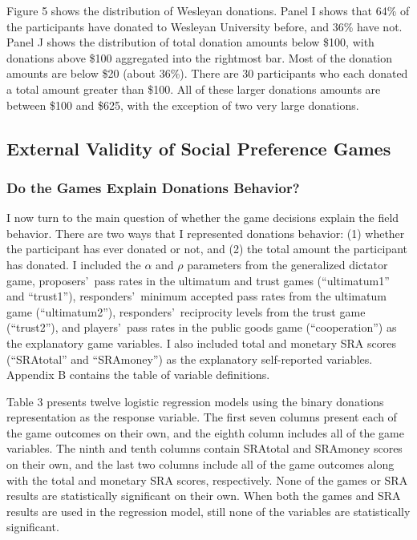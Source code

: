 \documentclass[12pt]{article}
\begin{document}
Figure 5 shows the distribution of Wesleyan donations. Panel I shows that 64\% of the participants have donated to Wesleyan University before, and 36\% have not. Panel J shows the distribution of total donation amounts below \$100, with donations above \$100 aggregated into the rightmost bar. Most of the donation amounts are below \$20 (about 36\%). There are 30 participants who each donated a total amount greater than \$100. All of these larger donations amounts are between \$100 and \$625, with the exception of two very large donations.

\subsection{External Validity of Social Preference Games}

\subsubsection{Do the Games Explain Donations Behavior?}
I now turn to the main question of whether the game decisions explain the field behavior. There are two ways that I represented donations behavior: (1) whether the participant has ever donated or not, and (2) the total amount the participant has donated. I included the \(\alpha\) and \(\rho\) parameters from the generalized dictator game, proposers\rq \ pass rates in the ultimatum and trust games (``ultimatum1'' and ``trust1''), responders\rq \ minimum accepted pass rates from the ultimatum game (``ultimatum2''), responders\rq \ reciprocity levels from the trust game (``trust2''), and players\rq \ pass rates in the public goods game (``cooperation'') as the explanatory game variables. I also included total and monetary SRA scores (``SRAtotal'' and ``SRAmoney'') as the explanatory self-reported variables. Appendix B contains the table of variable definitions. 

Table 3 presents twelve logistic regression models using the binary donations representation as the response variable. The first seven columns present each of the game outcomes on their own, and the eighth column includes all of the game variables. The ninth and tenth columns contain SRAtotal and SRAmoney scores on their own, and the last two columns include all of the game outcomes along with the total and monetary SRA scores, respectively. None of the games or SRA results are statistically significant on their own. When both the games and SRA results are used in the regression model, still none of the variables are statistically significant. 
\end{document}

